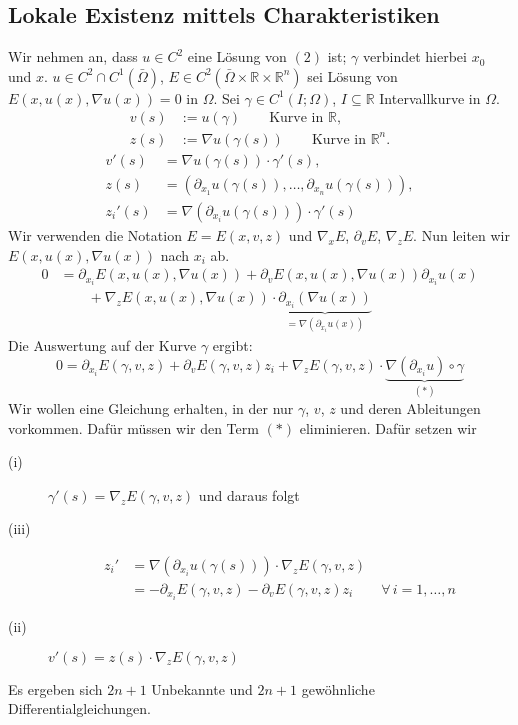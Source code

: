 \subsection{Lokale Existenz mittels Charakteristiken} 
\label{ssub:lokale_existenz_mittels_charakteristiken}
Wir nehmen an, dass $u \in C^2$ eine Lösung von $(2)$ ist; $\gamma$ verbindet hierbei $x_0$ und $x$. 
$u \in C^2 \cap C^1(\bar{\Omega})$, $E \in C^2(\bar{\Omega} \times \mathbb{R} \times \mathbb{R}^n)$ sei Lösung von $E(x,u(x), \nabla u(x)) = 0$ in $\Omega$. Sei $\gamma \in C^1(I;\Omega)$, $I \subseteq \mathbb{R}$ Intervallkurve in $\Omega$. \\
\begin{align*}
	v(s) &:= u(\gamma) \qquad \text{Kurve in }\mathbb{R}, \\
	z(s) &:=  \nabla u(\gamma(s)) \qquad \text{Kurve in }\mathbb{R}^n.	
\end{align*}
\begin{align*}
	v'(s) &=  \nabla u(\gamma(s)) \cdot \gamma'(s), \\
	z(s) &= (\partial_{x_1}u(\gamma(s)), \dots, \partial_{x_n}u(\gamma(s))), \\
	z_i'(s) &=  \nabla (\partial_{x_i} u(\gamma(s))) \cdot \gamma'(s)
\end{align*}
Wir verwenden die Notation $E = E(x,v,z)$ und $ \nabla_x E$, $\partial_v E$, $ \nabla_z E$. Nun leiten wir \\$E(x,u(x), \nabla u(x))$ nach $x_i$ ab.
\begin{align*}
	0 &= \partial_{x_i} E(x, u(x),  \nabla u(x)) + \partial_{v} E(x,u(x), \nabla u(x))\partial_{x_i} u(x) \\
	&\qquad +  \nabla_z E(x,u(x), \nabla u(x)) \cdot \underset{=  \nabla (\partial_{x_i}u(x))}{\underbrace{\partial_{x_i}( \nabla u(x))}}
\end{align*}
Die Auswertung auf der Kurve $\gamma$ ergibt:
\[
	0 = \partial_{x_i} E(\gamma,v,z) + \partial_v E(\gamma,v,z)z_i +  \nabla_z E(\gamma, v,z) \cdot  \underset{(*)}{\underbrace{\nabla (\partial_{x_i}u) \circ \gamma}}
\]
Wir wollen eine Gleichung erhalten, in der nur $\gamma$, $v$, $z$ und deren Ableitungen vorkommen. Dafür müssen wir den Term $(*)$ eliminieren. Dafür setzen wir
\begin{description}
	\item[(i)]$\gamma'(s)=  \nabla _z E(\gamma,v,z)$ und daraus folgt
	\item[(iii)] \begin{align*}
		z_i' &=  \nabla (\partial_{x_i} u(\gamma(s)))\cdot  \nabla _z E(\gamma,v,z) \\
		&= - \partial_{x_i} E(\gamma,v,z) - \partial_v E(\gamma,v,z)z_i \qquad \forall\, i=1,\dots,n
	\end{align*} 
	\item[(ii)] $v'(s) = z(s) \cdot  \nabla_z E(\gamma,v,z)$
\end{description}
Es ergeben sich $2n+1$ Unbekannte und $2n+1$ gewöhnliche Differentialgleichungen.

